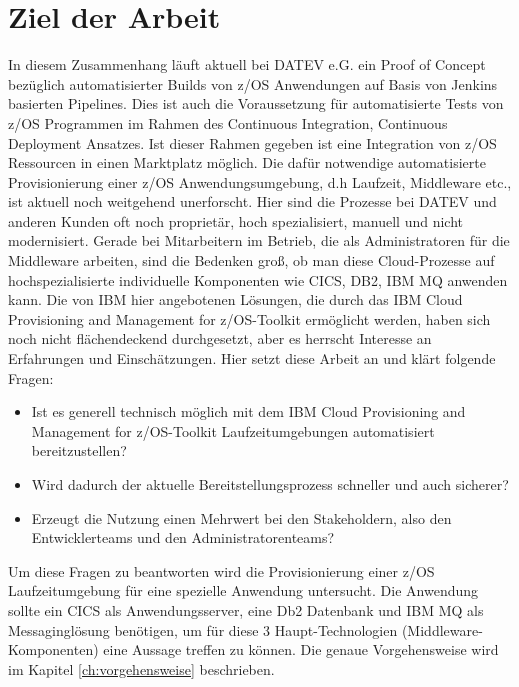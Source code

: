 \section{Ziel der Arbeit}\label{sec:ziel}
In diesem Zusammenhang läuft aktuell  bei DATEV e.G. ein Proof of Concept bezüglich automatisierter Builds von z/OS Anwendungen auf Basis von Jenkins basierten Pipelines.
Dies ist auch die Voraussetzung für automatisierte Tests von z/OS Programmen im Rahmen des \glqq Continuous Integration, Continuous Deployment\grqq{} Ansatzes.
Ist dieser Rahmen gegeben ist eine Integration von z/OS Ressourcen in einen Marktplatz möglich.
Die dafür notwendige automatisierte Provisionierung einer z/OS Anwendungsumgebung, d.h Laufzeit, Middleware etc., ist aktuell noch weitgehend unerforscht. 
Hier sind die Prozesse bei DATEV und anderen Kunden oft noch proprietär, hoch spezialisiert,  manuell und nicht modernisiert. 
Gerade bei Mitarbeitern im Betrieb, die als Administratoren für die Middleware arbeiten, sind die Bedenken groß, ob man diese Cloud-Prozesse auf hochspezialisierte individuelle Komponenten wie CICS, DB2, IBM MQ anwenden kann.
Die von IBM hier angebotenen Lösungen, die durch das \glqq IBM Cloud Provisioning and Management for z/OS\grqq-Toolkit ermöglicht werden, haben sich noch nicht flächendeckend durchgesetzt, aber es herrscht Interesse an Erfahrungen und Einschätzungen.
Hier setzt diese Arbeit an und klärt folgende Fragen:

\begin{samepage}
\begin{itemize}
\item Ist es generell technisch möglich mit dem \glqq IBM Cloud Provisioning and Management for z/OS\grqq-Toolkit Laufzeitumgebungen automatisiert bereitzustellen?
\item Wird dadurch der aktuelle Bereitstellungsprozess schneller und auch sicherer?
\item Erzeugt die Nutzung einen Mehrwert bei den Stakeholdern, also den Entwicklerteams und den Administratorenteams?
\end{itemize}
\end{samepage}

Um diese Fragen zu beantworten wird die Provisionierung einer z/OS Laufzeitumgebung für eine spezielle Anwendung untersucht.
Die Anwendung sollte ein CICS als Anwendungsserver, eine Db2 Datenbank und IBM MQ als Messaginglösung benötigen, um für diese 3 Haupt-Technologien (Middleware-Komponenten) eine Aussage treffen zu können.
Die genaue Vorgehensweise wird im Kapitel \ref{ch:vorgehensweise} beschrieben.
